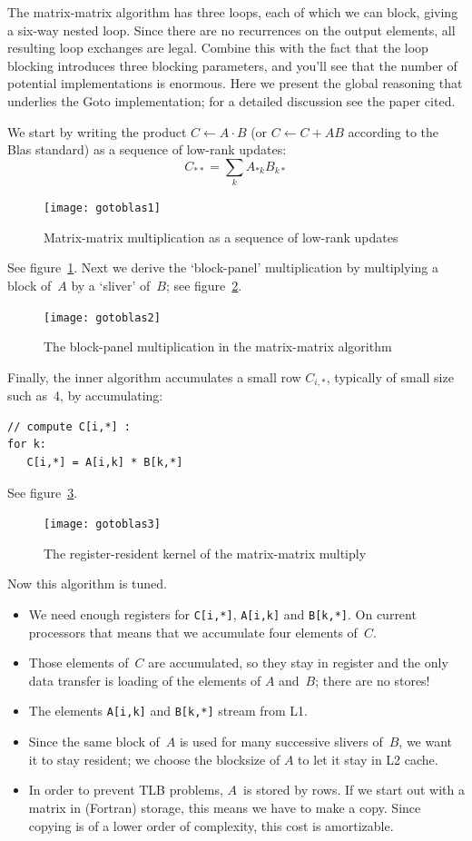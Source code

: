 The matrix-matrix algorithm has three loops, each of which we can block,
giving a six-way nested loop.
Since there are no recurrences on the output elements, all resulting
loop exchanges are legal. Combine this with the fact that the loop blocking
introduces three blocking parameters, and you'll see that the number of
potential implementations is enormous. Here we present the global reasoning
that underlies the Goto implementation; for a detailed discussion see the paper cited.

We start by writing the product $C\leftarrow A\cdot B$ (or
  $C\leftarrow C+AB$ according to the Blas standard) as a sequence of
  low-rank updates:
\[ C_{**} = \sum_k  A_{*k}B_{k*} \]
\begin{figure}[ht]
\texttt{[image: gotoblas1]}
\caption{Matrix-matrix multiplication as a sequence of low-rank updates}
\label{fig:goto1}
\end{figure}
See figure~\ref{fig:goto1}. Next we derive the `block-panel' multiplication
by multiplying a block of~$A$ by a `sliver' of~$B$; see figure~\ref{fig:goto2}.
\begin{figure}[ht]
\texttt{[image: gotoblas2]}  
\caption{The block-panel multiplication in the matrix-matrix algorithm}
\label{fig:goto2}
\end{figure}
Finally, the inner algorithm accumulates a small row $C_{i,*}$,
typically of small size such as~4, by accumulating:
\begin{verbatim}
// compute C[i,*] :
for k:
   C[i,*] = A[i,k] * B[k,*]
\end{verbatim}
See figure~\ref{fig:goto3}.
\begin{figure}[ht]
\texttt{[image: gotoblas3]}
\caption{The register-resident kernel of the matrix-matrix multiply}
\label{fig:goto3}
\end{figure}
Now this algorithm is tuned.
\begin{itemize}
\item We need enough registers for \verb+C[i,*]+, \verb+A[i,k]+ and
  \verb+B[k,*]+. On current processors that means that we accumulate
  four elements of~$C$.
\item Those elements of~$C$ are accumulated, so they stay in register
  and the only data transfer is loading of the elements of $A$
  and~$B$; there are no stores!
\item The elements \verb+A[i,k]+ and \verb+B[k,*]+ stream from L1.
\item Since the same block of~$A$ is used for many successive slivers
  of~$B$, we want it to stay resident; we choose the blocksize of $A$
  to let it stay in L2 cache.
\item In order to prevent TLB problems, $A$~is stored by rows. If we
  start out with a matrix in (Fortran) 
  storage, this means we have to make a copy. Since copying is of a
  lower order of complexity, this cost is amortizable.
\end{itemize}

